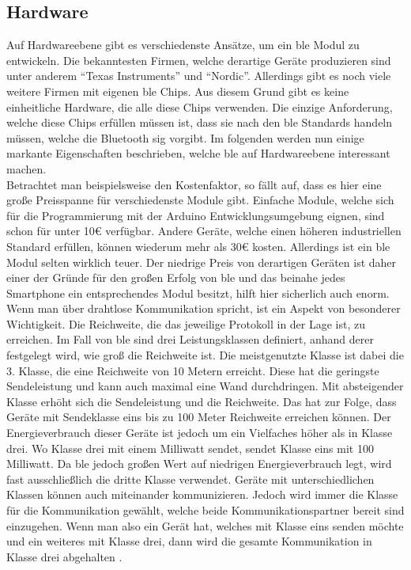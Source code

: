 \subsection{Hardware}
\label{ss:grundlagen:hardware}

Auf Hardwareebene gibt es verschiedenste Ansätze, um ein \ac{ble} Modul zu entwickeln. Die bekanntesten Firmen, welche derartige Geräte produzieren sind unter anderem "`Texas Instruments"' und "`Nordic"'. Allerdings gibt es noch viele weitere Firmen mit eigenen \ac{ble} Chips. Aus diesem Grund gibt es keine einheitliche Hardware, die alle diese Chips verwenden. Die einzige Anforderung, welche diese Chips erfüllen müssen ist, dass sie nach den \ac{ble} Standards handeln müssen, welche die Bluetooth \ac{sig} vorgibt. Im folgenden werden nun einige markante Eigenschaften beschrieben, welche \ac{ble} auf Hardwareebene interessant machen.\\

\noindent Betrachtet man beispielsweise den Kostenfaktor, so fällt auf, dass es hier eine große Preisspanne für verschiedenste Module gibt. Einfache Module, welche sich für die Programmierung mit der Arduino Entwicklungsumgebung eignen, sind schon für unter 10€ verfügbar. Andere Geräte, welche einen höheren industriellen Standard erfüllen, können wiederum mehr als 30€ kosten. Allerdings ist ein \ac{ble} Modul selten wirklich teuer. Der niedrige Preis von derartigen Geräten ist daher einer der Gründe für den großen Erfolg von \ac{ble} und das beinahe jedes Smartphone ein entsprechendes Modul besitzt, hilft hier sicherlich auch enorm.\\

\noindent Wenn man über drahtlose Kommunikation spricht, ist ein Aspekt von besonderer Wichtigkeit. Die Reichweite, die das jeweilige Protokoll in der Lage ist, zu erreichen. Im Fall von \ac{ble} sind drei Leistungsklassen definiert, anhand derer festgelegt wird, wie groß die Reichweite ist. Die meistgenutzte Klasse ist dabei die 3. Klasse, die eine Reichweite von 10 Metern erreicht. Diese hat die geringste Sendeleistung und kann auch maximal eine Wand durchdringen. Mit absteigender Klasse erhöht sich die Sendeleistung und die Reichweite. Das hat zur Folge, dass Geräte mit Sendeklasse eins bis zu 100 Meter Reichweite erreichen können. Der Energieverbrauch dieser Geräte ist jedoch um ein Vielfaches höher als in Klasse drei. Wo Klasse drei mit einem Milliwatt sendet, sendet Klasse eins mit 100 Milliwatt. Da \ac{ble} jedoch großen Wert auf niedrigen Energieverbrauch legt, wird fast ausschließlich die dritte Klasse verwendet. Geräte mit unterschiedlichen Klassen können auch miteinander kommunizieren. Jedoch wird immer die Klasse für die Kommunikation gewählt, welche beide Kommunikationspartner bereit sind einzugehen. Wenn man also ein Gerät hat, welches mit Klasse eins senden möchte und ein weiteres mit Klasse drei, dann wird die gesamte Kommunikation in Klasse drei abgehalten \cite[Seite 411]{Sauter18:GMK}.\\ 

